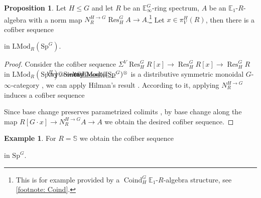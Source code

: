 \documentclass[a4paper, 10pt]{article}
\makeatletter
\newcommand{\E}{\mathbb E}  %
\renewcommand{\S}{\mathbb S}
\newcommand{\Sp}{\mathrm{Sp}}
\newcommand{\LMod}{\mathrm{LMod}}
\newcommand{\Res}{\operatorname{Res}}
\newcommand{\Coind}{\operatorname{Coind}}
\DeclareMathOperator*{\colim}{colim}
\DeclareRobustCommand{\myuline}[2][0pt]{%
  \ifmmode
    \uline{\hphantom{#2}\kern-#1}%
    \kern#1%
    \mathllap{\mathpalette\my@cont@{#2}}%
  \else
    \uline{\phantom{#2}\kern-#1}%
    \kern#1%
    \llap{\contour{white}{#2}}%
  \fi
}
\newcommand{\ul}{\myuline}
\newcommand{\my@cont@}[2]{\contour{white}{\mbox{$\m@th#1#2$}}}
\newcommand{\notehelper}[3]{\textcolor{#3}{$\blacksquare$}\marginpar{\ifodd\thepage\raggedright\else\raggedleft\fi\color{#3}\tiny \textbf{#2:} #1}}
\newcommand\qi[1]{\notehelper{#1}{Qi}{blue}}
\theoremstyle{definition}
\newtheorem{proposition}[proposition]{Proposition}
\newtheorem{example}[example]{Example}
\makeatother
\begin{document}
\begin{proposition}
    Let $H \leq G$ and let \(R\) be an \(\E^G_\infty\)-ring spectrum, \(A\) be an $\E_1$-\(R\)-algebra with a norm map $N_R^{H \to G} \Res_H^G A \to A$.\footnote{This is for example provided by a $\Coind_H^G \E_1$-$R$-algebra structure, see \cref{footnote: Coind}.} Let \(x\in \pi^H_V(R)\), then there is a cofiber sequence %
    \begin{center}
    \end{center}
    in $\LMod_R(\Sp^G)$.
\end{proposition}

\begin{proof}
    Consider the cofiber sequence \(\Sigma^{V} \Res_H^GR[x]\to \Res_H^G R[x]\to \Res_H^G R\) in $\LMod_R(\Sp^H)$.
    Since $\ul{\LMod}_R(\ul{\Sp}^G)^{\otimes}$ is a distributive symmetric monoidal $G$-$\infty$-category \cite[Theorem A]{quinnZhu2026multiplicativeequivariantthomspectra}, we can apply Hilman's result \cite[Proposition 3.2.8]{hilman2024parametrisednoncommutativemotivesequivariant}. According to it, applying $N_R^{H \to G}$ induces a cofiber sequence
    \begin{center}
    \end{center}
    Since base change preserves parametrized colimits \cite[Proposition 3.3.11]{quinnZhu2026multiplicativeequivariantthomspectra}, by base change along the map \(R[G\cdot x]\to N_R^{H \to G} A \to A\) we obtain the desired cofiber sequence.
\end{proof}

\begin{example}
    For $R = \S$ we obtain the cofiber sequence
    \begin{center}
    \end{center}
    in $\Sp^G$.
\end{example}
\end{document}
